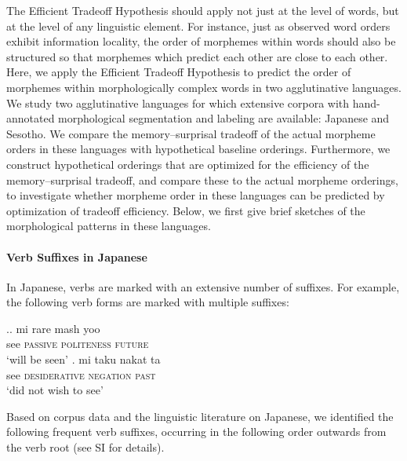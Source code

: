 
\label{sec:morphemes}

The Efficient Tradeoff Hypothesis should apply not just at the level of words, but at the level of any linguistic element.
For instance, just as observed word orders exhibit information locality, the order of morphemes within words should also be structured so that morphemes which predict each other are close to each other.
Here, we apply the Efficient Tradeoff Hypothesis to predict the order of morphemes within morphologically complex words in two agglutinative languages. We study two agglutinative languages for which extensive corpora with hand-annotated morphological segmentation and labeling are available: Japanese and Sesotho. 
We compare the memory--surprisal tradeoff of the actual morpheme orders in these languages with hypothetical baseline orderings.
Furthermore, we construct hypothetical orderings that are optimized for the efficiency of the memory--surprisal tradeoff, and compare these to the actual morpheme orderings, to investigate whether morpheme order in these languages can be predicted by optimization of tradeoff efficiency.
Below, we first give brief sketches of the morphological patterns in these languages. 


\paragraph{Verb Suffixes in Japanese}

In Japanese, verbs are marked with an extensive number of suffixes. For example, the following verb forms are marked with multiple suffixes:

\ex.\ag. mi  rare mash yoo \\
see  \textsc{passive}  \textsc{politeness}  \textsc{future} \\
`will be seen'
\bg. mi taku nakat ta \\
see \textsc{desiderative} \textsc{negation} \textsc{past} \\
`did not wish to see'

Based on corpus data and the linguistic literature on Japanese, we identified the following frequent verb suffixes, occurring in the following order outwards from the verb root (see SI for details).


